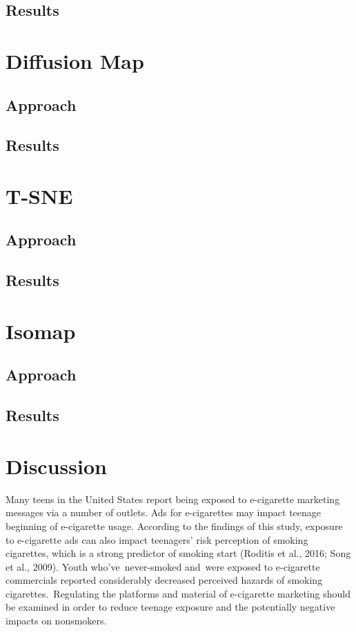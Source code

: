 \documentclass[12pt]{article}
\begin{document}
\subsection{Results}

\section{Diffusion Map} \label{sec: Diffusion Map}

\subsection{Approach}

\subsection{Results}

\section{T-SNE} \label{sec: T-SNE}
\subsection{Approach}

\subsection{Results}

\section{Isomap} \label{sec: Isomap}
\subsection{Approach}

\subsection{Results}


\section{Discussion} \label{sec:discussion}

\hspace{5mm}Many teens in the United States report being exposed to e-cigarette marketing messages via a number of outlets. Ads for e-cigarettes may impact teenage beginning of e-cigarette usage. According to the findings of this study, exposure to e-cigarette ads can also impact teenagers' risk perception of smoking cigarettes, which is a strong predictor of smoking start (Roditis et al., 2016; Song et al., 2009). Youth who've never-smoked and were exposed to e-cigarette commercials reported considerably decreased perceived hazards of smoking cigarettes. Regulating the platforms and material of e-cigarette marketing should be examined in order to reduce teenage exposure and the potentially negative impacts on nonsmokers. 
\end{document}
